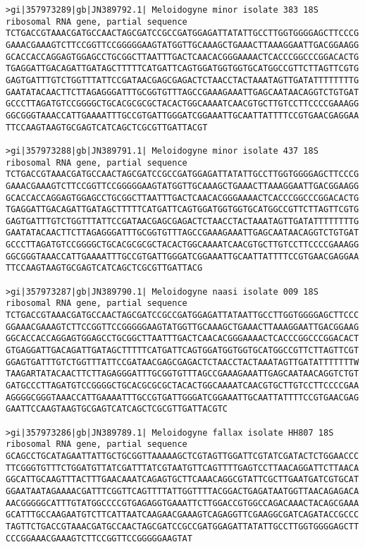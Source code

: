 \documentclass[11pt]{article}
\begin{document}
\begin{Verbatim}[commandchars=\\\{\}]
>gi|357973289|gb|JN389792.1| Meloidogyne minor isolate 383 18S ribosomal RNA gene, partial sequence
TCTGACCGTAAACGATGCCAACTAGCGATCCGCCGATGGAGATTATATTGCCTTGGTGGGGAGCTTCCCG
GAAACGAAAGTCTTCCGGTTCCGGGGGAAGTATGGTTGCAAAGCTGAAACTTAAAGGAATTGACGGAAGG
GCACCACCAGGAGTGGAGCCTGCGGCTTAATTTGACTCAACACGGGAAAACTCACCCGGCCCGGACACTG
TGAGGATTGACAGATTGATAGCTTTTTCATGATTCAGTGGATGGTGGTGCATGGCCGTTCTTAGTTCGTG
GAGTGATTTGTCTGGTTTATTCCGATAACGAGCGAGACTCTAACCTACTAAATAGTTGATATTTTTTTTG
GAATATACAACTTCTTAGAGGGATTTGCGGTGTTTAGCCGAAAGAAATTGAGCAATAACAGGTCTGTGAT
GCCCTTAGATGTCCGGGGCTGCACGCGCGCTACACTGGCAAAATCAACGTGCTTGTCCTTCCCCGAAAGG
GGCGGGTAAACCATTGAAAATTTGCCGTGATTGGGATCGGAAATTGCAATTATTTTCCGTGAACGAGGAA
TTCCAAGTAAGTGCGAGTCATCAGCTCGCGTTGATTACGT

>gi|357973288|gb|JN389791.1| Meloidogyne minor isolate 437 18S ribosomal RNA gene, partial sequence
TCTGACCGTAAACGATGCCAACTAGCGATCCGCCGATGGAGATTATATTGCCTTGGTGGGGAGCTTCCCG
GAAACGAAAGTCTTCCGGTTCCGGGGGAAGTATGGTTGCAAAGCTGAAACTTAAAGGAATTGACGGAAGG
GCACCACCAGGAGTGGAGCCTGCGGCTTAATTTGACTCAACACGGGAAAACTCACCCGGCCCGGACACTG
TGAGGATTGACAGATTGATAGCTTTTTCATGATTCAGTGGATGGTGGTGCATGGCCGTTCTTAGTTCGTG
GAGTGATTTGTCTGGTTTATTCCGATAACGAGCGAGACTCTAACCTACTAAATAGTTGATATTTTTTTTG
GAATATACAACTTCTTAGAGGGATTTGCGGTGTTTAGCCGAAAGAAATTGAGCAATAACAGGTCTGTGAT
GCCCTTAGATGTCCGGGGCTGCACGCGCGCTACACTGGCAAAATCAACGTGCTTGTCCTTCCCCGAAAGG
GGCGGGTAAACCATTGAAAATTTGCCGTGATTGGGATCGGAAATTGCAATTATTTTCCGTGAACGAGGAA
TTCCAAGTAAGTGCGAGTCATCAGCTCGCGTTGATTACG

>gi|357973287|gb|JN389790.1| Meloidogyne naasi isolate 009 18S ribosomal RNA gene, partial sequence
TCTGACCGTAAACGATGCCAACTAGCGATCCGCCGATGGAGATTATAATTGCCTTGGTGGGGAGCTTCCC
GGAAACGAAAGTCTTCCGGTTCCGGGGGAAGTATGGTTGCAAAGCTGAAACTTAAAGGAATTGACGGAAG
GGCACCACCAGGAGTGGAGCCTGCGGCTTAATTTGACTCAACACGGGAAAACTCACCCGGCCCGGACACT
GTGAGGATTGACAGATTGATAGCTTTTTCATGATTCAGTGGATGGTGGTGCATGGCCGTTCTTAGTTCGT
GGAGTGATTTGTCTGGTTTATTCCGATAACGAGCGAGACTCTAACCTACTAAATAGTTGATATTTTTTTW
TAAGARTATACAACTTCTTAGAGGGATTTGCGGTGTTTAGCCGAAAGAAATTGAGCAATAACAGGTCTGT
GATGCCCTTAGATGTCCGGGGCTGCACGCGCGCTACACTGGCAAAATCAACGTGCTTGTCCTTCCCCGAA
AGGGGCGGGTAAACCATTGAAAATTTGCCGTGATTGGGATCGGAAATTGCAATTATTTTCCGTGAACGAG
GAATTCCAAGTAAGTGCGAGTCATCAGCTCGCGTTGATTACGTC

>gi|357973286|gb|JN389789.1| Meloidogyne fallax isolate HH807 18S ribosomal RNA gene, partial sequence
GCAGCCTGCATAGAATTATTGCTGCGGTTAAAAAGCTCGTAGTTGGATTCGTATCGATACTCTGGAACCC
TTCGGGTGTTTCTGGATGTTATCGATTTATCGTAATGTTCAGTTTTGAGTCCTTAACAGGATTCTTAACA
GGCATTGCAAGTTTACTTTGAACAAATCAGAGTGCTTCAAACAGGCGTATTCGCTTGAATGATCGTGCAT
GGAATAATAGAAAACGATTTCGGTTCAGTTTTATTGGTTTTACGGACTGAGATAATGGTTAACAGAGACA
AACGGGGGCATTTGTATGGCCCCGTGAGAGGTGAAATTCTTGGACCGTGGCCAGACAAACTACAGCGAAA
GCATTTGCCAAGAATGTCTTCATTAATCAAGAACGAAAGTCAGAGGTTCGAAGGCGATCAGATACCGCCC
TAGTTCTGACCGTAAACGATGCCAACTAGCGATCCGCCGATGGAGATTATATTGCCTTGGTGGGGAGCTT
CCCGGAAACGAAAGTCTTCCGGTTCCGGGGGAAGTAT


\end{Verbatim}
\end{document}
